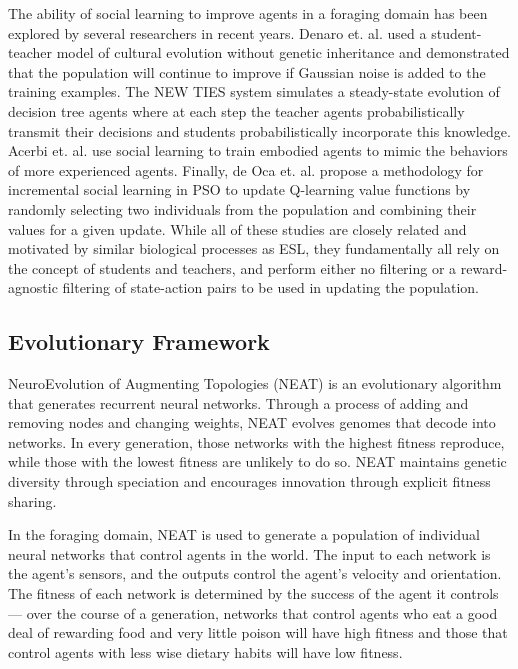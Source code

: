 \documentclass{sig-alternate}
\begin{document}
The ability of social learning to improve agents in a foraging domain has been explored by several researchers in recent years. Denaro et. al. \cite{denaro1996cultural} used a student-teacher model of cultural evolution without genetic inheritance and demonstrated that the population will continue to improve if Gaussian noise is added to the training examples. The NEW TIES system \cite{haasdijk2008social, vogt2010modeling} simulates a steady-state evolution of decision tree agents where at each step the teacher agents probabilistically transmit their decisions and students probabilistically incorporate this knowledge. Acerbi et. al. \cite{acerbi2007social} use social learning to train embodied agents to mimic the behaviors of more experienced agents. Finally, de Oca et. al. \cite{de2011incremental} propose a methodology for incremental social learning in PSO to update Q-learning \cite{watkins1992q} value functions by randomly selecting two individuals from the population and combining their values for a given update. While all of these studies are closely related and motivated by similar biological processes as ESL, they fundamentally all rely on the concept of students and teachers, and perform either no filtering or a reward-agnostic filtering of state-action pairs to be used in updating the population.

\subsection{Evolutionary Framework}
NeuroEvolution of Augmenting Topologies (NEAT)\cite{stanley2002evolving} is an evolutionary algorithm that generates recurrent neural networks. Through a process of adding and removing nodes and changing weights, NEAT evolves genomes that decode into networks. In every generation, those networks with the highest fitness reproduce, while those with the lowest fitness are unlikely to do so. NEAT maintains genetic diversity through speciation and encourages innovation through explicit fitness sharing.

In the foraging domain, NEAT is used to generate a population of individual neural networks that control agents in the world. The input to each network is the agent's sensors, and the outputs control the agent's velocity and orientation. The fitness of each network is determined by the success of the agent it controls--- over the course of a generation, networks that control agents who eat a good deal of rewarding food and very little poison will have high fitness and those that control agents with less wise dietary habits will have low fitness.
\end{document}
